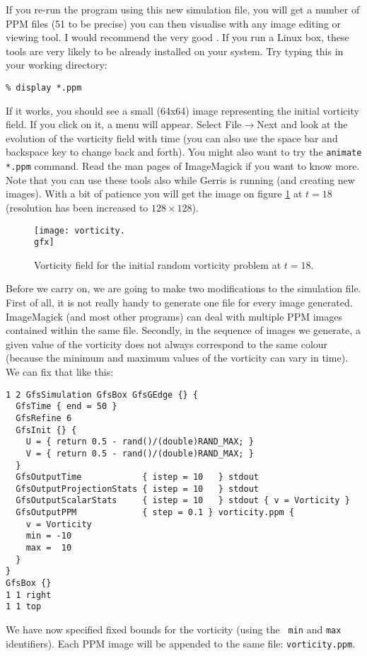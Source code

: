 \documentclass[a4paper]{article}
\begin{document}
If you re-run the program using this new simulation file, you will get
a number of {\sc PPM} files (51 to be precise) you can then visualise
with any image editing or viewing tool. I would recommend the very
good . If you
run a Linux box, these tools are very likely to be already installed
on your system. Try typing this in your working directory:
\begin{verbatim}
% display *.ppm
\end{verbatim}
If it works, you should see a small (64x64) image representing the
initial vorticity field. If you click on it, a menu will
appear. Select File$\rightarrow$Next and look at the evolution of the
vorticity field with time (you can also use the space bar and
backspace key to change back and forth). You might also want to try
the {\tt animate *.ppm} command. Read the man pages of ImageMagick if
you want to know more. Note that you can use these tools also while
Gerris is running (and creating new images). With a bit of patience
you will get the image on figure \ref{vorticity} at $t=18$ (resolution
has been increased to $128\times 128$).
\begin{figure}
\begin{center}
\texttt{[image: vorticity.\\gfx]}
\end{center}
\caption{Vorticity field for the initial random vorticity problem at
$t=18$.}
\label{vorticity}
\end{figure}

Before we carry on, we are going to make two modifications to the
simulation file. First of all, it is not really handy to generate one
file for every image generated. ImageMagick (and most other programs)
can deal with multiple {\sc PPM} images contained within the same
file. Secondly, in the sequence of images we generate, a given value
of the vorticity does not always correspond to the same colour
(because the minimum and maximum values of the vorticity can vary in
time). We can fix that like this:
\begin{verbatim}
1 2 GfsSimulation GfsBox GfsGEdge {} {
  GfsTime { end = 50 }
  GfsRefine 6
  GfsInit {} {
    U = { return 0.5 - rand()/(double)RAND_MAX; }
    V = { return 0.5 - rand()/(double)RAND_MAX; }
  }  
  GfsOutputTime            { istep = 10   } stdout
  GfsOutputProjectionStats { istep = 10   } stdout
  GfsOutputScalarStats     { istep = 10   } stdout { v = Vorticity }
  GfsOutputPPM             { step = 0.1 } vorticity.ppm {
    v = Vorticity 
    min = -10
    max =  10
  }
}
GfsBox {}
1 1 right
1 1 top
\end{verbatim}
We have now specified fixed bounds for the vorticity (using the {\tt
min} and {\tt max} identifiers). Each {\sc PPM} image will be appended to
the same file: {\tt vorticity.ppm}.
\end{document}
